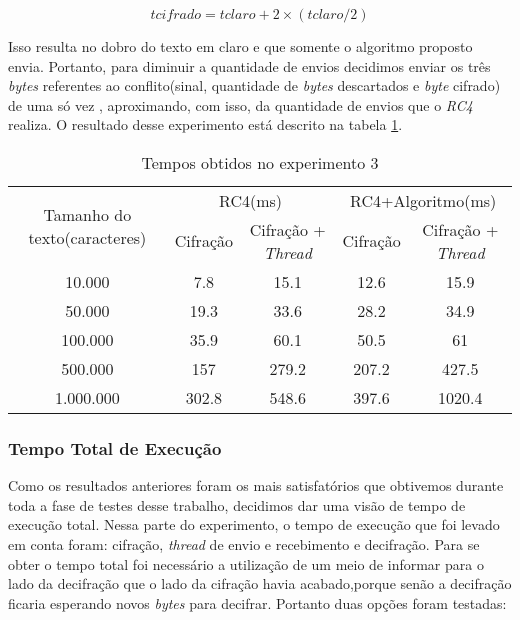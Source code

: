 \begin{equation}
	tcifrado = tclaro + 2 \times (tclaro/2)
\end{equation}

Isso resulta no dobro do texto em claro e que somente o algoritmo proposto envia. Portanto, para diminuir a quantidade de envios decidimos enviar os três \textit{bytes} referentes ao conflito(sinal, quantidade de \textit{bytes} descartados e \textit{byte} cifrado) de uma só vez , aproximando, com isso, da quantidade de envios que o \textit{RC4} realiza. O resultado desse experimento está descrito na tabela \ref{results-experiment-3}.

\begin{table}[h]
\centering
\begin{tabular}{|c|c|c|c|c|}
\hline
\multirow{2}{3cm}{Tamanho do texto(caracteres)} & \multicolumn{2}{c|}{RC4(ms)}         & \multicolumn{2}{c|}{RC4+Algoritmo(ms)} \\ \cline{2-5} 
                                              & Cifração & Cifração + \textit{Thread} & Cifração  & Cifração + \textit{Thread}   \\ \hline
10.000                                        & 7.8      & 15.1                  & 12.6      & 15.9                   \\ \hline
50.000                                        & 19.3     & 33.6                  & 28.2      & 34.9                   \\ \hline
100.000                                       & 35.9     & 60.1                  & 50.5      & 61                     \\ \hline
500.000                                       & 157      & 279.2                 & 207.2     & 427.5                  \\ \hline
1.000.000                                     & 302.8    & 548.6                 & 397.6     & 1020.4                 \\ \hline
\end{tabular}
\caption{Tempos obtidos no experimento 3}
\label{results-experiment-3}
\end{table}

\subsubsection{Tempo Total de Execução}

Como os resultados anteriores foram os mais satisfatórios que obtivemos durante toda a fase de testes desse trabalho, decidimos dar uma visão de tempo de execução total. Nessa parte do experimento, o tempo de execução que foi levado em conta foram: cifração, \textit{thread} de envio e recebimento e decifração. Para se obter o tempo total foi necessário a utilização de um meio de informar para o lado da decifração que o lado da cifração havia acabado,porque senão a decifração ficaria esperando novos \textit{bytes} para decifrar. Portanto duas opções foram testadas:

